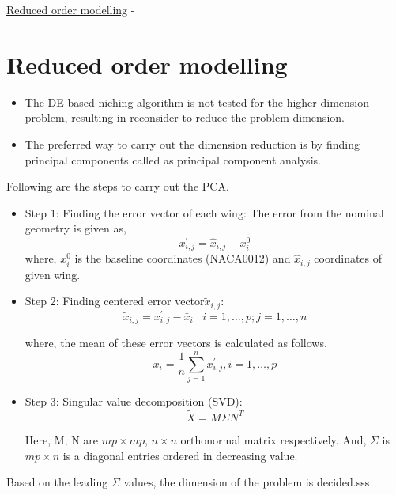 \begin{frame}[allowframebreaks]{\underline{Reduced order modelling} -}
    \section{Reduced order modelling}
    
\begin{itemize}
\item The DE based niching algorithm is not tested for the higher dimension
problem, resulting in reconsider to reduce the problem dimension. 
\item The preferred way to carry out the dimension reduction is by finding principal components called as principal component analysis.
\end{itemize}
\vspace{1mm}
Following are the steps to carry out the PCA.
\begin{itemize}
    
\item Step 1: Finding the error vector of each wing:
    The error from the nominal geometry is given as,
$$x_{i, j}^{\prime}=\hat{x}_{i, j}-x_{i}^{0}$$
where, $x_{i}^{0}$ is the baseline coordinates (NACA0012) and $\hat{x}_{i, j}$ coordinates of given wing.
\item Step 2: Finding centered error vector$\tilde{x}_{i, j}$:
\begin{equation}
\tilde{x}_{i, j}=x_{i, j}^{\prime}-\bar{x}_{i} \mid i=1, \ldots, p ; j=1, \ldots, n
\end{equation}

where, the mean of these error vectors is calculated as follows.
\begin{equation}
\bar{x}_{i}=\frac{1}{n} \sum_{j=1}^{n} x_{i, j}^{\prime}, i=1, \ldots, p
\end{equation}

\item Step 3: Singular value decomposition (SVD):
\begin{equation}
\tilde{X}=M \Sigma N^{T}
\end{equation}

Here, M, N are $mp \times mp$, $n \times n$ orthonormal matrix respectively. And, $\Sigma$ is $mp \times n$ is a diagonal entries ordered in decreasing value. 
\end{itemize}
Based on the leading $\Sigma$ values, the dimension of the problem is decided.sss
\end{frame}